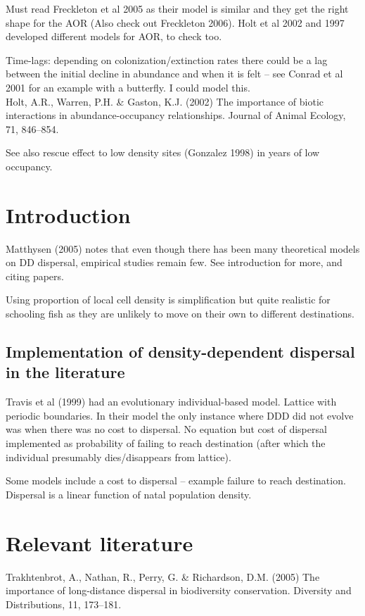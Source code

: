 \documentclass{article}
\begin{document}
Must read Freckleton et al 2005 as their model is similar and they get
the right shape for the AOR (Also check out Freckleton 2006). Holt et al 2002 and 1997 developed
different models for AOR, to check too.

Time-lags: depending on colonization/extinction rates there could be a
lag between the initial decline in abundance and when it is felt --
see Conrad et al 2001 for an example with a butterfly. I could model
this. \\

Holt, A.R., Warren, P.H. \& Gaston, K.J. (2002) The importance of
biotic interactions in abundance-occupancy relationships. Journal of
Animal Ecology, 71, 846–854.

See also rescue effect to low density sites (Gonzalez 1998) in years
of low occupancy.
\section{Introduction}
Matthysen (2005) notes that even though there has been many
theoretical models on DD dispersal, empirical studies remain few. See
introduction for more, and citing papers.

Using proportion of local cell density is simplification but quite
realistic for schooling fish as they are unlikely to move on their own
to different destinations.

\subsection{Implementation of density-dependent dispersal in the
  literature}
Travis et al (1999) had an evolutionary individual-based
model. Lattice with periodic boundaries. In their model the only
instance where DDD did not evolve was when there was no cost to
dispersal. No equation but cost of dispersal implemented as
probability of failing to reach destination (after which the
individual presumably dies/disappears from lattice).

Some models include a cost to dispersal -- example failure to reach
destination. Dispersal is a linear function of natal population
density.

\section{Relevant literature}
Trakhtenbrot, A., Nathan, R., Perry, G. \& Richardson, D.M. (2005) The
importance of long-distance dispersal in biodiversity
conservation. Diversity and Distributions, 11, 173–181. \\
\end{document}
